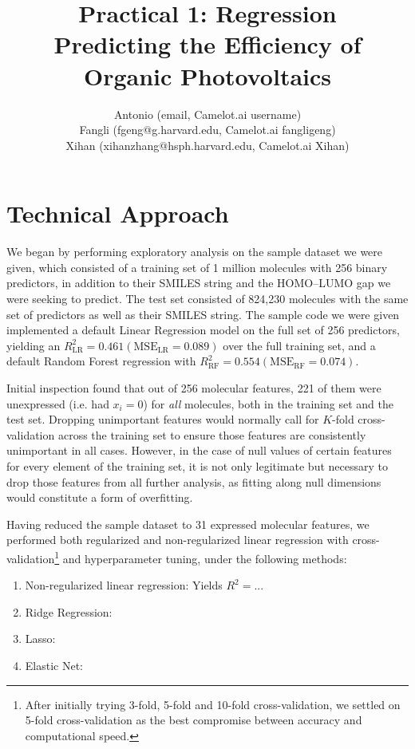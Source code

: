 \documentclass[11pt]{article}
\title{Practical 1: Regression \\ Predicting the Efficiency of Organic Photovoltaics}
\author{Antonio (email, Camelot.ai username) \\
	Fangli (fgeng@g.harvard.edu, Camelot.ai fangligeng) \\
	Xihan (xihanzhang@hsph.harvard.edu, Camelot.ai Xihan)}
\begin{document}
\maketitle{}



\section{Technical Approach}

We began by performing exploratory analysis on the sample dataset we were given, which consisted of a training set of 1 million molecules with 256 binary predictors, in addition to their SMILES string and the HOMO--LUMO gap we were seeking to predict. The test set consisted of 824,230 molecules with the same set of predictors as well as their SMILES string. The sample code we were given implemented a default Linear Regression model on the full set of 256 predictors, yielding an $R_\textrm{LR}^2 = 0.461 (\textrm{MSE}_\textrm{LR} = 0.089)$ over the full training set, and a default Random Forest regression with $R_\textrm{RF}^2 = 0.554 (\textrm{MSE}_\textrm{RF} = 0.074)$.

Initial inspection found that out of 256 molecular features, 221 of them were unexpressed (i.e. had $x_i = 0$) for \emph{all} molecules, both in the training set and the test set. Dropping unimportant features would normally call for $K$-fold cross-validation across the training set to ensure those features are consistently unimportant in all cases. However, in the case of null values of certain features for every element of the training set, it is not only legitimate but necessary to drop those features from all further analysis, as fitting along null dimensions would constitute a form of overfitting.

Having reduced the sample dataset to 31 expressed molecular features, we performed both regularized and non-regularized linear regression with cross-validation\footnote{After initially trying 3-fold, 5-fold and 10-fold cross-validation, we settled on 5-fold cross-validation as the best compromise between accuracy and computational speed.} and hyperparameter tuning, under the following methods:

\begin{enumerate}

\item Non-regularized linear regression: Yields $R^2 =  ...$
\item Ridge Regression: 
\item Lasso:
\item Elastic Net:

\end{enumerate}
\end{document}
